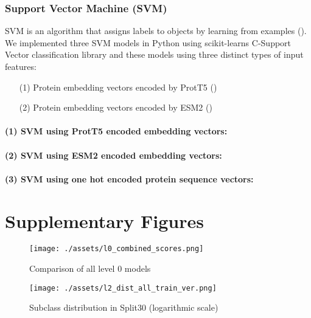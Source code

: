 \documentclass{bioinfo}
\begin{document}



\subsubsection{Support Vector Machine (SVM)}
SVM is an algorithm that assigns labels to objects by learning from examples (\cite{svm}).
We implemented three SVM models in Python using scikit-learns C-Support Vector classification library and these models using three distinct types of 
input features: 
\begin{enumerate}
	\item[(1)] Protein embedding vectors encoded by ProtT5 (\cite{ProtT5})
	\item[(2)] Protein embedding vectors encoded by ESM2 (\cite{ESM2})
\end{enumerate}

%

\paragraph{(1) SVM using ProtT5 encoded embedding vectors:}

\paragraph{(2) SVM using ESM2 encoded embedding vectors:}

\paragraph{(3) SVM using one hot encoded protein sequence vectors:}



\section{Supplementary Figures}\label{sec:supplementary figures}
\begin{figure}[!ht]
	\texttt{[image: ./assets/l0\_combined\_scores.png]}
	\caption{Comparison of all level 0 models}
	\label{fig:l0_comp_all}
\end{figure}
\begin{figure}[!ht]
\texttt{[image: ./assets/l2\_dist\_all\_train\_ver.png]}
\caption{Subclass distribution in Split30 (logarithmic scale)}\label{fig:l2_dist_train}
\end{figure}

\newpage
\newpage

 

\end{document}

